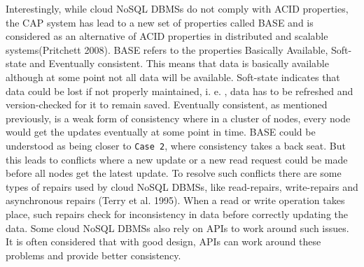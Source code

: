 Interestingly,   while cloud \ac{NoSQL} \acp{DBMS} do not comply with ACID
properties,   the CAP system has lead to a new set of properties called BASE and
is considered as an alternative of ACID properties in distributed and scalable
systems(Pritchett 2008). 
BASE refers to the properties Basically Available,   Soft-state and Eventually
consistent.  This means that data is basically available although at some point
not all data will be available.  Soft-state indicates that data could be lost if
not properly maintained,   i. e. ,   data has to be refreshed and version-checked for
it to remain saved.  Eventually consistent,   as mentioned previously,   is a weak
form of consistency where in a cluster of nodes,   every node would get the
updates eventually at some point in time. 
BASE could be understood as being closer to \texttt{Case 2},   where consistency
takes a back seat.  But this leads to conflicts where a new update or a new read
request could be made before all nodes get the latest update.  To resolve such
conflicts there are some types of repairs used by cloud \ac{NoSQL} \acp{DBMS},  
like read-repairs,   write-repairs and asynchronous repairs (Terry et al.  1995). 
When a read or write operation takes place,   such repairs check for inconsistency
in data before correctly updating the data.  Some cloud \ac{NoSQL} \acp{DBMS} also rely
on APIs to work around such issues.  It is often considered that with good
design,   \acp{API} can work around these problems and provide better consistency. 

